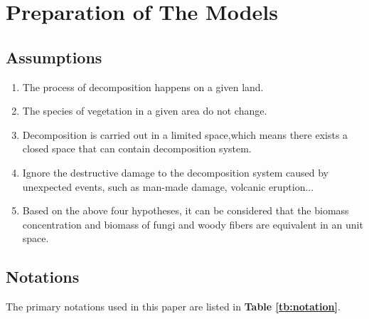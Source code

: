 \documentclass[12pt]{article}
\begin{document}
\section{Preparation of The Models}
\subsection{Assumptions}

\begin{enumerate}[\bfseries 1.]	
	\item The process of decomposition happens on a given land.
	
	\item The species of vegetation in a given area do not change.
	
	\item Decomposition is carried out in a limited space,which means there exists a closed space that can contain decomposition system.
	
	\item Ignore the destructive damage to the decomposition system caused by unexpected events, such as man-made damage, volcanic eruption...
	
	\item Based on the above four hypotheses, it can be considered that the biomass concentration and biomass of fungi and woody fibers are equivalent in an unit space.
\end{enumerate}\par



\subsection{Notations}
The primary notations used in this paper are listed in \textbf{Table \ref{tb:notation}}.

\end{document}
